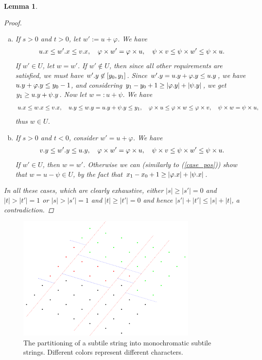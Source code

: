 \documentclass[11pt, letterpaper]{article}
\theoremstyle{plain}
\newtheorem{lemma}{Lemma}
\theoremstyle{definition}
\theoremstyle{remark}
\renewcommand{\phi}{\varphi}
\newcommand{\eq}[1]{\begin{align*} #1 \end{align*}}
\newcommand{\absolute}[1]{\left\lvert#1\right\rvert}
\begin{document}
\begin{lemma}
\begin{proof}
\begin{enumerate}[(a)]
			\item If $s > 0$ and $t > 0$, let $w' := u + \phi$. \label{case_pos}
				We have \eq{
					\x{u} \le \x{w'} \le \x{v}, \quad \h{w'} = \h{u}, \quad \s{v} \le \s{w'} \le \s{u}.
				}
				If $w' \in U$, let $w = w'$.
				If $w' \not \in U$, then since all other requirements are satisfied, we must have $w'.y \not \in [y_0, y_1]$.
				Since $\y{w'} = \y{u} + \y{\phi} \le \y{u}$, we have $\y{u} + \y{\phi} \le y_0 - 1$, and
				considering $y_1 - y_0 + 1 \ge \absolute{\y{\phi}} + \absolute{\y{\psi}}$, we get $y_1 \ge u.y + \psi.y$.
				Now let $w =: u + \psi$.
				We have \eq{
					\x{u} \le \x{w} \le \x{v}, \quad \y{u} \le \y{w} = \y{u} + \y{\psi} \le y_1, \quad \h{u} \le \h{w} \le \h{v}, \quad \s{w} = \s{u},
				}
				thus $w \in U$.
			\item If $s > 0$ and $t < 0$, consider $w' = u + \phi$.
				We have \eq{
					\y{v} \le \y{w'} \le \y{u}, \quad \h{w'} = \h{u}, \quad \s{v} \le \s{w'} \le \s{u}.
				}
				If $w' \in U$, then $w = w'$.
				Otherwise we can (similarly to (\ref{case_pos})) show that $w = u - \psi \in U$, by the fact that $x_1 - x_0 + 1 \ge \absolute{\x{\phi}} + \absolute{\x{\psi}}$. 
		\end{enumerate}
		In all these cases, which are clearly exhaustive, either $\absolute{s} \ge \absolute{s'} = 0$ and $\absolute{t} > \absolute{t'} = 1$ or $\absolute{s} > \absolute{s'} = 1$ and $\absolute{t} \ge \absolute{t'} = 0$ and hence $\absolute{s'}+\absolute{t'} \le \absolute{s}+\absolute{t}$, a contradiction. 
	\end{proof}
\end{lemma}


\begin{figure}[!t]
	\begin{center}
		\includegraphics[width=0.8\textwidth]{drawings/parquet_decomposition}
	\end{center}
	\caption{The partitioning of a subtile string into monochromatic subtile strings. Different colors represent different characters.}
	\label{figure:tile_decomposition}
\end{figure}
\end{document}
